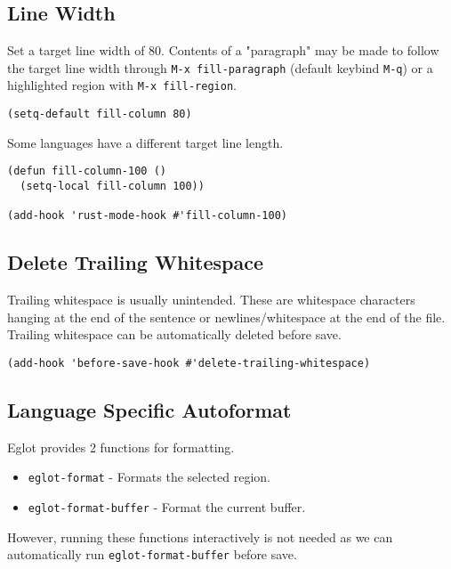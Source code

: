 \documentclass[11pt]{article}
\begin{document}
\subsection{Line Width}
\label{sec:orgd9ade2c}

Set a target line width of 80. Contents of a "paragraph" may be made to follow
the target line width through \texttt{M-x fill-paragraph} (default keybind \texttt{M-q}) or a
highlighted region with \texttt{M-x fill-region}.

\begin{verbatim}
(setq-default fill-column 80)
\end{verbatim}

Some languages have a different target line length.

\begin{verbatim}
(defun fill-column-100 ()
  (setq-local fill-column 100))

(add-hook 'rust-mode-hook #'fill-column-100)
\end{verbatim}
\subsection{Delete Trailing Whitespace}
\label{sec:orgc028895}

Trailing whitespace is usually unintended. These are whitespace characters
hanging at the end of the sentence or newlines/whitespace at the end of the
file. Trailing whitespace can be automatically deleted before save.

\begin{verbatim}
(add-hook 'before-save-hook #'delete-trailing-whitespace)
\end{verbatim}
\subsection{Language Specific Autoformat}
\label{sec:orgcbf0c33}

Eglot provides 2 functions for formatting.

\begin{itemize}
\item \texttt{eglot-format} - Formats the selected region.
\item \texttt{eglot-format-buffer} - Format the current buffer.
\end{itemize}

However, running these functions interactively is not needed as we can
automatically run \texttt{eglot-format-buffer} before save.
\end{document}
